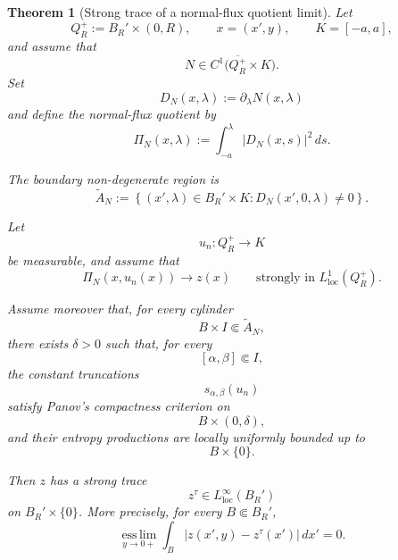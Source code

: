 \documentclass[11pt]{amsart}
\numberwithin{equation}{section}
\theoremstyle{plain}
\newtheorem{theorem}{Theorem}[section]
\theoremstyle{definition}
\theoremstyle{remark}
\begin{document}
\begin{theorem}[Strong trace of a normal-flux quotient limit]
\label{thm:strong-trace-normal-flux-quotient}
Let
\[
    Q_R^+
    :=
    B_R'\times(0,R),
    \qquad
    x=(x',y),
    \qquad
    K=[-a,a],
\]
and assume that
\[
    N\in C^1\bigl(\overline{Q_R^+}\times K\bigr).
\]
Set
\[
    D_N(x,\lambda)
    :=
    \partial_\lambda N(x,\lambda)
\]
and define the normal-flux quotient by
\begin{equation}
\label{eq:normal-flux-quotient-trace-theorem}
    \Pi_N(x,\lambda)
    :=
    \int_{-a}^{\lambda}
        |D_N(x,s)|^2\,ds.
\end{equation}

The boundary non-degenerate region is
\begin{equation}
\label{eq:boundary-normal-nondegenerate-region}
    \widetilde A_N
    :=
    \left\{
        (x',\lambda)\in B_R'\times K:
        D_N(x',0,\lambda)\neq0
    \right\}.
\end{equation}

Let
\[
    u_n:Q_R^+\to K
\]
be measurable, and assume that
\begin{equation}
\label{eq:normal-quotient-interior-limit}
    \Pi_N(x,u_n(x))
    \longrightarrow z(x)
    \qquad
    \text{strongly in }L^1_{\mathrm{loc}}(Q_R^+).
\end{equation}

Assume moreover that, for every cylinder
\[
    B\times I\Subset\widetilde A_N,
\]
there exists \(\delta>0\) such that, for every
\[
    [\alpha,\beta]\Subset I,
\]
the constant truncations
\[
    s_{\alpha,\beta}(u_n)
\]
satisfy Panov's compactness criterion on
\[
    B\times(0,\delta),
\]
and their entropy productions are locally uniformly bounded up to
\[
    B\times\{0\}.
\]

Then \(z\) has a strong trace
\[
    z^\tau\in L^\infty_{\mathrm{loc}}(B_R')
\]
on \(B_R'\times\{0\}\).  More precisely, for every
\(B\Subset B_R'\),
\begin{equation}
\label{eq:normal-quotient-strong-trace}
    \operatorname*{ess\,lim}_{y\to0+}
    \int_B
        |z(x',y)-z^\tau(x')|\,dx'
    =0.
\end{equation}
\end{theorem}
\end{document}
